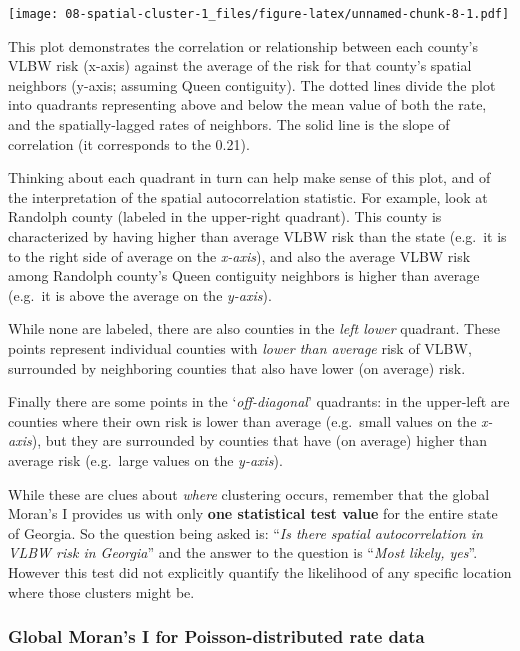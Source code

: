 \documentclass[
]{book}
\begin{document}
\texttt{[image: 08-spatial-cluster-1\_files/figure-latex/unnamed-chunk-8-1.pdf]}

This plot demonstrates the correlation or relationship between each county's VLBW risk (x-axis) against the average of the risk for that county's spatial neighbors (y-axis; assuming Queen contiguity). The dotted lines divide the plot into quadrants representing above and below the mean value of both the rate, and the spatially-lagged rates of neighbors. The solid line is the slope of correlation (it corresponds to the 0.21).

Thinking about each quadrant in turn can help make sense of this plot, and of the interpretation of the spatial autocorrelation statistic. For example, look at Randolph county (labeled in the upper-right quadrant). This county is characterized by having higher than average VLBW risk than the state (e.g.~it is to the right side of average on the \emph{x-axis}), and also the average VLBW risk among Randolph county's Queen contiguity neighbors is higher than average (e.g.~it is above the average on the \emph{y-axis}).

While none are labeled, there are also counties in the \emph{left lower} quadrant. These points represent individual counties with \emph{lower than average} risk of VLBW, surrounded by neighboring counties that also have lower (on average) risk.

Finally there are some points in the `\emph{off-diagonal}' quadrants: in the upper-left are counties where their own risk is lower than average (e.g.~small values on the \emph{x-axis}), but they are surrounded by counties that have (on average) higher than average risk (e.g.~large values on the \emph{y-axis}).

While these are clues about \emph{where} clustering occurs, remember that the global Moran's I provides us with only \textbf{one statistical test value} for the entire state of Georgia. So the question being asked is: ``\emph{Is there spatial autocorrelation in VLBW risk in Georgia}'' and the answer to the question is ``\emph{Most likely, yes}''. However this test did not explicitly quantify the likelihood of any specific location where those clusters might be.

\hypertarget{global-morans-i-for-poisson-distributed-rate-data}{%
\subsubsection{Global Moran's I for Poisson-distributed rate data}\label{global-morans-i-for-poisson-distributed-rate-data}}
\end{document}
